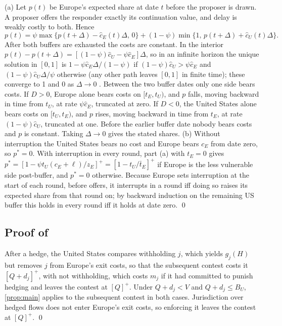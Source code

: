 (a) Let $p(t)$ be Europe's expected share at date $t$ before the proposer is drawn. A proposer offers the responder exactly its continuation value, and delay is weakly costly to both. Hence
\begin{equation*}
p(t) = \psi \max\{p(t+\Delta) - \hat c_E(t)\Delta,\, 0\} + (1-\psi)\min\{1,\, p(t+\Delta) + \hat c_U(t)\Delta\}.
\end{equation*}
After both buffers are exhausted the costs are constant. In the interior $p(t) - p(t+\Delta) = [(1-\psi)\hat c_U - \psi\hat c_E]\Delta$, so in an infinite horizon the unique solution in $[0,1]$ is $1-\psi\hat c_E\Delta/(1-\psi)$ if $(1-\psi)\hat c_U > \psi\hat c_E$ and $(1-\psi)\hat c_U\Delta/\psi$ otherwise (any other path leaves $[0,1]$ in finite time); these converge to 1 and 0 as $\Delta\to 0$ \citep[cf. the fixed-cost case of][]{rubinstein1982perfect}. Between the two buffer dates only one side bears costs. If $D>0$, Europe alone bears costs on $[t_E,t_U)$, and $p$ falls, moving backward in time from $t_U$, at rate $\psi\hat c_E$, truncated at zero. If $D<0$, the United States alone bears costs on $[t_U,t_E)$, and $p$ rises, moving backward in time from $t_E$, at rate $(1-\psi)\hat c_U$, truncated at one. Before the earlier buffer date nobody bears costs and $p$ is constant. Taking $\Delta\to 0$ gives the stated shares.
(b) Without interruption the United States bears no cost and Europe bears $c_E$ from date zero, so $p^*=0$. With interruption in every round, part (a) with $t_E=0$ gives $p^* = [1 - \psi t_U (c_E+\ell)/z_E]^+ = [1-t_U/\bar t_E]^+$ if Europe is the less vulnerable side post-buffer, and $p^*=0$ otherwise. Because Europe sets interruption at the start of each round, before offers, it interrupts in a round iff doing so raises its expected share from that round on; by backward induction on the remaining US buffer this holds in every round iff it holds at date zero. \qed

\subsection*{Proof of }

After a hedge, the United States compares withholding $j$, which yields $g_j(H)$ but removes $j$ from Europe's exit costs, so that the subsequent contest costs it $[Q + d_j]^+$, with not withholding, which costs $m_j$ if it had committed to punish hedging and leaves the contest at $[Q]^+$. Under $Q + d_j < V$ and $Q+d_j \leq B_U$, \cref{prop:main} applies to the subsequent contest in both cases. Jurisdiction over hedged flows does not enter Europe's exit costs, so enforcing it leaves the contest at $[Q]^+$. \qed


